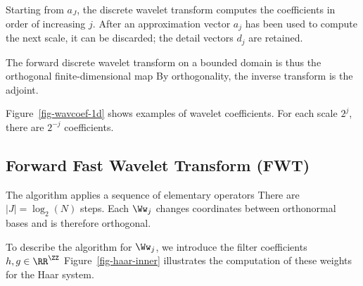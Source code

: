 Starting from $a_J$, the discrete wavelet transform computes the coefficients
in order of increasing $j$. After an approximation vector $a_j$ has been used to compute the next scale, it can be discarded; the detail vectors $d_j$ are retained.

The forward discrete wavelet transform on a bounded domain is thus the orthogonal finite-dimensional map
By orthogonality, the inverse transform is the adjoint.


Figure~\ref{fig-wavcoef-1d} shows examples of wavelet coefficients. For each scale $2^j$, there are $2^{-j}$ coefficients.



\subsection{Forward Fast Wavelet Transform (FWT)}

The algorithm applies a sequence of elementary operators
There are $|J|=\log_2(N)$ steps. Each $\Ww_j$ changes coordinates between orthonormal bases and is therefore orthogonal.

To describe the algorithm for $\Ww_j$, we introduce the filter coefficients $h,g \in \RR^\ZZ$
Figure~\ref{fig-haar-inner} illustrates the computation of these weights for the Haar system.

